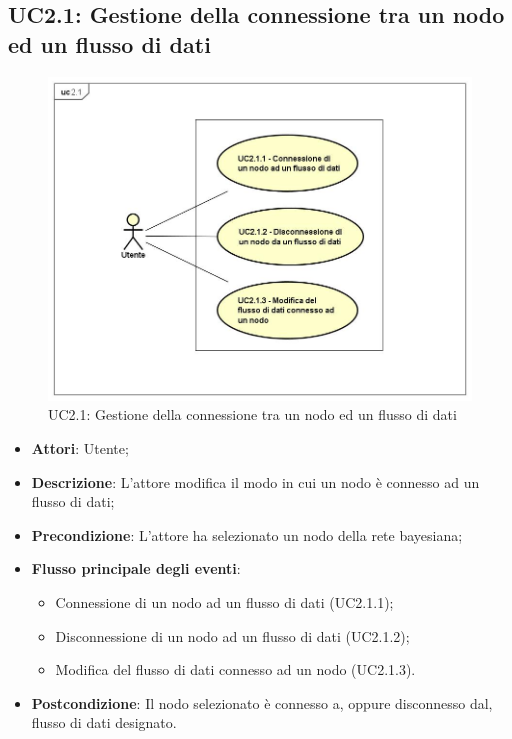 \subsection{UC2.1: Gestione della connessione tra un nodo ed un flusso di dati}
\hypertarget{UC2.1}{}
\begin{figure} [H]
	\centering
	\includegraphics[scale=0.45]{Img/UC2-1}
	\caption{UC2.1: Gestione della connessione tra un nodo ed un flusso di dati}\label{}
\end{figure}
\begin{itemize}
	\item \textbf{Attori}: Utente;
	\item \textbf{Descrizione}: L'attore modifica il modo in cui un nodo è connesso ad un flusso di dati;
	\item \textbf{Precondizione}: L'attore ha selezionato un nodo della rete bayesiana;
	\item \textbf{Flusso principale degli eventi}:
	\begin{itemize}
		\item Connessione di un nodo ad un flusso di dati (UC2.1.1);
		\item Disconnessione di un nodo ad un flusso di dati (UC2.1.2);
		\item Modifica del flusso di dati connesso ad un nodo (UC2.1.3).
	\end{itemize}
	\item \textbf{Postcondizione}: Il nodo selezionato è connesso a, oppure disconnesso dal, flusso di dati designato.
\end{itemize}

